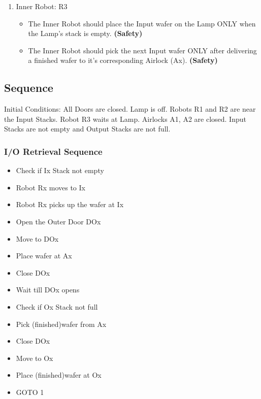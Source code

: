 \documentclass[a4paper,12pt]{article}
\begin{document}
\begin{enumerate}
\item Inner Robot: R3
	\begin{itemize}
	\item The Inner Robot should place the Input wafer on the Lamp ONLY when the Lamp's stack is empty.\textbf{ (Safety)}
	\item The Inner Robot should pick the next Input wafer ONLY after delivering a finished wafer to it's corresponding Airlock (Ax).\textbf{ (Safety)}
	\end{itemize}

\end{enumerate}

\iffalse
\subsection{Sequence}
Initial Conditions: All Doors are closed. Lamp is off. Robots R1 and R2 are near the Input Stacks. Robot R3 waits at Lamp. Airlocks A1, A2 are closed. Input Stacks are not empty and Output Stacks are not full.
\subsubsection {I/O Retrieval Sequence }
\begin{itemize}
\item Check if Ix Stack not empty
\item Robot Rx moves to Ix
\item Robot Rx picks up the wafer at Ix 
\item Open the Outer Door DOx
\item Move to DOx
\item Place wafer at Ax
\item Close DOx
\item Wait till DOx opens
\item Check if Ox Stack not full
\item Pick (finished)wafer from Ax
\item Close DOx
\item Move to Ox
\item Place (finished)wafer at Ox
\item GOTO 1
\end{itemize}
\end{document}
